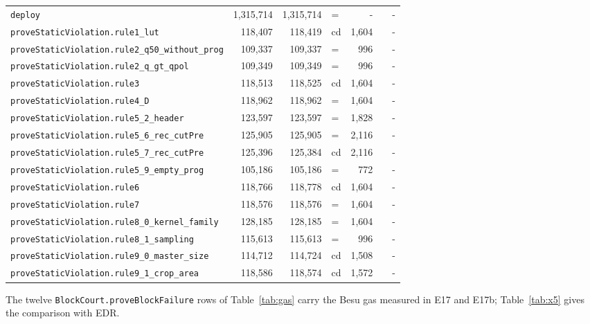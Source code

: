 \documentclass[10pt]{article}
\begin{document}
{\begin{longtable}{@{}lrrlrcr@{}}
\quad\texttt{deploy} & 1{,}315{,}714 & 1{,}315{,}714 & = & - &  & - \\
\quad\texttt{proveStaticViolation.rule1\_lut} & 118{,}407 & 118{,}419 & cd & 1{,}604 &  & - \\
\quad\texttt{proveStaticViolation.rule2\_q50\_without\_prog} & 109{,}337 & 109{,}337 & = & 996 &  & - \\
\quad\texttt{proveStaticViolation.rule2\_q\_gt\_qpol} & 109{,}349 & 109{,}349 & = & 996 &  & - \\
\quad\texttt{proveStaticViolation.rule3} & 118{,}513 & 118{,}525 & cd & 1{,}604 &  & - \\
\quad\texttt{proveStaticViolation.rule4\_D} & 118{,}962 & 118{,}962 & = & 1{,}604 &  & - \\
\quad\texttt{proveStaticViolation.rule5\_2\_header} & 123{,}597 & 123{,}597 & = & 1{,}828 &  & - \\
\quad\texttt{proveStaticViolation.rule5\_6\_rec\_cutPre} & 125{,}905 & 125{,}905 & = & 2{,}116 &  & - \\
\quad\texttt{proveStaticViolation.rule5\_7\_rec\_cutPre} & 125{,}396 & 125{,}384 & cd & 2{,}116 &  & - \\
\quad\texttt{proveStaticViolation.rule5\_9\_empty\_prog} & 105{,}186 & 105{,}186 & = & 772 &  & - \\
\quad\texttt{proveStaticViolation.rule6} & 118{,}766 & 118{,}778 & cd & 1{,}604 &  & - \\
\quad\texttt{proveStaticViolation.rule7} & 118{,}576 & 118{,}576 & = & 1{,}604 &  & - \\
\quad\texttt{proveStaticViolation.rule8\_0\_kernel\_family} & 128{,}185 & 128{,}185 & = & 1{,}604 &  & - \\
\quad\texttt{proveStaticViolation.rule8\_1\_sampling} & 115{,}613 & 115{,}613 & = & 996 &  & - \\
\quad\texttt{proveStaticViolation.rule9\_0\_master\_size} & 114{,}712 & 114{,}724 & cd & 1{,}508 &  & - \\
\quad\texttt{proveStaticViolation.rule9\_1\_crop\_area} & 118{,}586 & 118{,}574 & cd & 1{,}572 &  & - \\
\end{longtable}}
The twelve \texttt{BlockCourt.proveBlockFailure} rows of Table~\ref{tab:gas} carry the Besu gas measured in E17 and
E17b; Table~\ref{tab:x5} gives the comparison with EDR.
\end{document}
